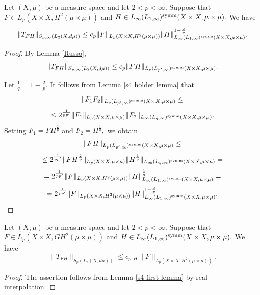 \documentclass{amsart}
\numberwithin{equation}{section}
\begin{document}
\begin{lemma}\label{s4 first lemma}
Let $(X,\mu)$ be a measure space and let $2<p<\infty.$ Suppose that $F\in L_p(X\times X,H^2(\mu\times\mu))$ and $H\in L_{\infty}(L_{1,\infty})^{\rm symm}(X\times X,\mu\times\mu).$ We have
$$\|T_{FH}\|_{S_{p,\infty}(L_2(X,d\mu))}\leq c_p \|F\|_{L_p(X\times X,H^2(\mu\times\mu))}\|H\|_{L_{\infty}(L_{1,\infty})^{\rm symm}(X\times X,\mu\times\mu)}^{1-\frac2p}.$$
\end{lemma}
\begin{proof} By Lemma \ref{Russo},
$$\|T_{FH}\|_{S_{p,\infty}(L_2(X,d\mu))}\leq c_p \|FH\|_{L_p(L_{p',\infty})^{\rm symm}(X\times X,\mu\times\mu)}.$$

Let $\frac1q=1-\frac2p.$ It follows from Lemma \ref{s4 holder lemma} that
$$\|F_1F_2\|_{L_p(L_{p',\infty})^{{\rm symm}}(X\times X,\mu\times\mu)}\leq$$
$$\leq 2^{\frac1{pp'}}\|F_1\|_{L_p(X\times X,\mu\times\mu)}\|F_2\|_{L_{\infty}(L_{q,\infty})^{{\rm symm}}(X\times X,\mu\times\mu)}.$$
Setting $F_1=FH^{\frac2p}$ and $F_2=H^{\frac1q},$ we obtain
$$\|FH\|_{L_p(L_{p',\infty})^{\rm symm}(X\times X,\mu\times\mu)}\leq$$
$$\leq 2^{\frac1{pp'}}\|FH^{\frac2p}\|_{L_p(X\times X,\mu\times\mu)}\|H^{\frac1q}\|_{L_{\infty}(L_{q,\infty})^{{\rm symm}}(X\times X,\mu\times\mu)}=$$
$$=2^{\frac1{pp'}}\|F\|_{L_p(X\times X,H^2(\mu\times\mu))}\|H\|_{L_{\infty}(L_{1,\infty})^{{\rm symm}}(X\times X,\mu\times\mu)}^{\frac1q}=$$
$$=2^{\frac1{pp'}}\|F\|_{L_p(X\times X,H^2(\mu\times\mu))}\|H\|_{L_{\infty}(L_{1,\infty})^{{\rm symm}}(X\times X,\mu\times\mu)}^{1-\frac2p}.$$
\end{proof}

\begin{lemma}\label{s4 second lemma}
Let $(X,\mu)$ be a measure space and let $2<p<\infty.$ Suppose that $F\in L_p(X\times X,GH^2(\mu\times\mu))$ and $H\in L_{\infty}(L_{1,\infty})^{\rm symm}(X\times X,\mu\times\mu).$ We have
$$\|T_{FH}\|_{S_p(L_2(X,d\mu))}\leq c_{p,H}\|F\|_{L_p(X\times X,H^2(\mu\times\mu))}.$$
\end{lemma}
\begin{proof} The assertion follows from Lemma \ref{s4 first lemma} by real interpolation.
\end{proof}
\end{document}
